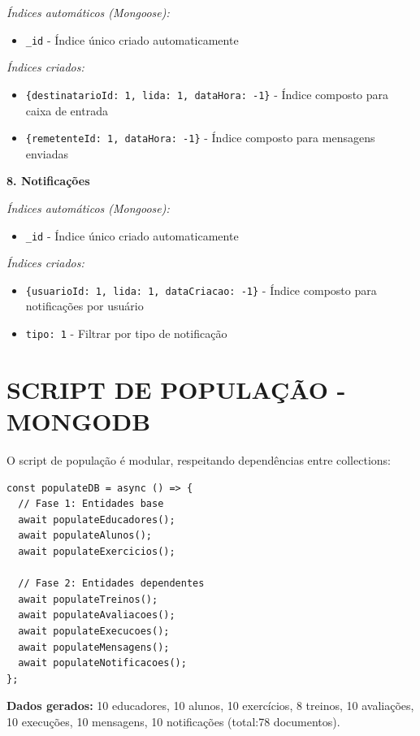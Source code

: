 \documentclass[12pt,a4paper]{article}
\begin{document}
\textit{Índices automáticos (Mongoose):}
\begin{itemize}
    \item \texttt{\_id} - Índice único criado automaticamente
\end{itemize}

\textit{Índices criados:}
\begin{itemize}
    \item \texttt{\{destinatarioId: 1, lida: 1, dataHora: -1\}} - Índice composto para caixa de entrada
    \item \texttt{\{remetenteId: 1, dataHora: -1\}} - Índice composto para mensagens enviadas
\end{itemize}

\textbf{8. Notificações}

\textit{Índices automáticos (Mongoose):}
\begin{itemize}
    \item \texttt{\_id} - Índice único criado automaticamente
\end{itemize}

\textit{Índices criados:}
\begin{itemize}
    \item \texttt{\{usuarioId: 1, lida: 1, dataCriacao: -1\}} - Índice composto para notificações por usuário
    \item \texttt{tipo: 1} - Filtrar por tipo de notificação
\end{itemize}

\section{SCRIPT DE POPULAÇÃO - MONGODB}

O script de população é modular, respeitando dependências entre collections:

\begin{lstlisting}[caption=Orquestrador de População]
const populateDB = async () => {
  // Fase 1: Entidades base
  await populateEducadores();
  await populateAlunos();
  await populateExercicios();
  
  // Fase 2: Entidades dependentes
  await populateTreinos();
  await populateAvaliacoes();
  await populateExecucoes();
  await populateMensagens();
  await populateNotificacoes();
};
\end{lstlisting}

\textbf{Dados gerados:} 10 educadores, 10 alunos, 10 exercícios, 8 treinos, 10 avaliações, 10 execuções, 10 mensagens, 10 notificações (total:78 documentos).
\end{document}
